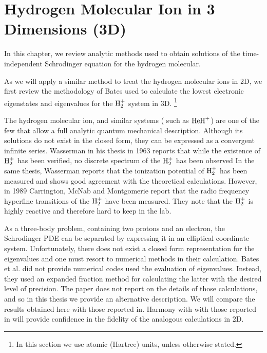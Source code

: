 \chapter{Hydrogen Molecular Ion in 3 Dimensions (3D) }

In this chapter, we review analytic methods\cite{Bates1}\cite{Bates2}\cite{Slater} used to obtain 
solutions of the time-independent Schrodinger equation for 
the hydrogen molecular.

As we will apply a similar method to treat the hydrogen molecular ions in 2D,
we first review the methodology of Bates \cite{Bates1}\cite{Bates2} used to calculate the lowest electronic eigenstates and eigenvalues for the $ {\rm H}_2^{+} $ system in 3D. \footnote {In this section we
use atomic (Hartree) units, unless otherwise stated.}

The hydrogen molecular ion, and similar systems ( such as $ {\rm HeH}^{+} $) are one of the few that allow a full analytic quantum mechanical description. Although its
solutions do not exist in the closed form, they can be expressed as a convergent infinite series.  Wasserman in his thesis \cite{ExperimentalBates2} in 1963 reports that while the existence of $ {\rm H}_2^{+} $ has been verified, no  discrete spectrum of the  $ {\rm H}_2^{+} $ has been observed  In the same thesis, Wasserman reports that the ionization potential of $ {\rm H}_2^{+} $ has been measured and shows good agreement with the theoretical calculations. However, in 1989 Carrington, McNab and Montgomerie report \cite{ExperimentalBates3} that the radio frequency hyperfine transitions of the $ {\rm H}_2^{+} $ have been measured. They note that the $ {\rm H}_2^{+} $  is highly reactive and therefore hard to keep in the lab.

As a three-body problem, containing two protons and an electron,
the Schrodinger PDE can be separated by expressing it in an elliptical coordinate system. Unfortunately, there does not exist a closed form representation for the eigenvalues and one must resort to numerical methods in their calculation.
Bates et al. \cite{Bates1}\cite{Bates2} did not provide numerical codes used the evaluation of eigenvalues. Instead, they used an expanded fraction method for calculating the latter with the desired level of precision. The paper\cite{Bates2} does not report on the details of those calculations, and so in this thesis we provide an alternative description. We will compare
 the results obtained here with those reported in\cite{Bates2}. Harmony with with those reported in\cite{Bates2} will provide 
 confidence in the fidelity of the analogous calculations in 2D.


